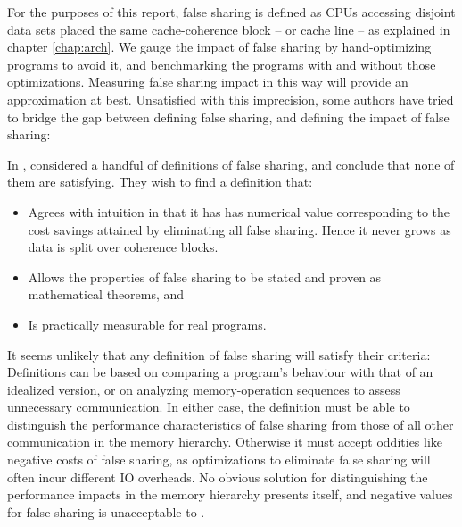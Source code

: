 For the purposes of this report, false sharing is defined as CPUs accessing
disjoint data sets placed the same cache-coherence block -- or cache line -- as
explained in chapter \ref{chap:arch}. We gauge the impact of false sharing by
hand-optimizing programs to avoid it, and benchmarking the programs with and
without those optimizations. Measuring false sharing impact in this way will
provide an approximation at best. Unsatisfied with this imprecision, some
authors have tried to bridge the gap between defining false sharing, and
defining the impact of false sharing:

In \citeyear{falsedef}, \citeauthor{falsedef} \cite{falsedef} considered a handful
of definitions of false sharing, and conclude that none of them are satisfying.
They wish to find a definition that:

\begin{itemize}
	\item Agrees with intuition in that it has has numerical value
		corresponding to the cost savings attained by eliminating all
		false sharing. Hence it never grows as data is split over
		coherence blocks.
	\item Allows the properties of false sharing to be stated and proven as
		mathematical theorems, and
	\item Is practically measurable for real programs.
\end{itemize}

It seems unlikely that any definition of false sharing will satisfy their
criteria: Definitions can be based on comparing a program's
behaviour with that of an idealized version\footnotemark, or on analyzing
memory-operation sequences to assess unnecessary communication. In either case,
the definition must be able to distinguish the performance characteristics of false
sharing from those of all other communication in the memory hierarchy. Otherwise
it must accept oddities like negative costs of false sharing, as optimizations
to eliminate false sharing will often incur different IO overheads. No obvious
solution for distinguishing the performance impacts in the memory hierarchy
presents itself, and negative values for false sharing is unacceptable to
\citeauthor{falsedef}.


